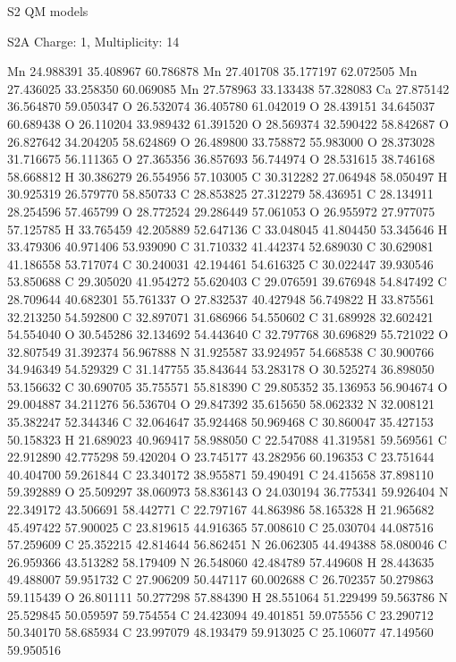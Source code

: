 \documentclass{article}
\begin{document}
S2 QM models  
   
S2A   Charge: 1, Multiplicity: 14    
   
Mn 24.988391 35.408967 60.786878
Mn 27.401708 35.177197 62.072505
Mn 27.436025 33.258350 60.069085
Mn 27.578963 33.133438 57.328083
Ca 27.875142 36.564870 59.050347
O 26.532074 36.405780 61.042019
O 28.439151 34.645037 60.689438
O 26.110204 33.989432 61.391520
O 28.569374 32.590422 58.842687
O 26.827642 34.204205 58.624869
O 26.489800 33.758872 55.983000
O 28.373028 31.716675 56.111365
O 27.365356 36.857693 56.744974
O 28.531615 38.746168 58.668812
H 30.386279 26.554956 57.103005
C 30.312282 27.064948 58.050497
H 30.925319 26.579770 58.850733
C 28.853825 27.312279 58.436951
C 28.134911 28.254596 57.465799
O 28.772524 29.286449 57.061053
O 26.955972 27.977075 57.125785
H 33.765459 42.205889 52.647136
C 33.048045 41.804450 53.345646
H 33.479306 40.971406 53.939090
C 31.710332 41.442374 52.689030
C 30.629081 41.186558 53.717074
C 30.240031 42.194461 54.616325
C 30.022447 39.930546 53.850688
C 29.305020 41.954272 55.620403
C 29.076591 39.676948 54.847492
C 28.709644 40.682301 55.761337
O 27.832537 40.427948 56.749822
H 33.875561 32.213250 54.592800
C 32.897071 31.686966 54.550602
C 31.689928 32.602421 54.554040
O 30.545286 32.134692 54.443640
C 32.797768 30.696829 55.721022
O 32.807549 31.392374 56.967888
N 31.925587 33.924957 54.668538
C 30.900766 34.946349 54.529329
C 31.147755 35.843644 53.283178
O 30.525274 36.898050 53.156632
C 30.690705 35.755571 55.818390
C 29.805352 35.136953 56.904674
O 29.004887 34.211276 56.536704
O 29.847392 35.615650 58.062332
N 32.008121 35.382247 52.344346
C 32.064647 35.924468 50.969468
C 30.860047 35.427153 50.158323
H 21.689023 40.969417 58.988050
C 22.547088 41.319581 59.569561
C 22.912890 42.775298 59.420204
O 23.745177 43.282956 60.196353
C 23.751644 40.404700 59.261844
C 23.340172 38.955871 59.490491
C 24.415658 37.898110 59.392889
O 25.509297 38.060973 58.836143
O 24.030194 36.775341 59.926404
N 22.349172 43.506691 58.442771
C 22.797167 44.863986 58.165328
H 21.965682 45.497422 57.900025
C 23.819615 44.916365 57.008610
C 25.030704 44.087516 57.259609
C 25.352215 42.814644 56.862451
N 26.062305 44.494388 58.080046
C 26.959366 43.513282 58.179409
N 26.548060 42.484789 57.449608
H 28.443635 49.488007 59.951732
C 27.906209 50.447117 60.002688
C 26.702357 50.279863 59.115439
O 26.801111 50.277298 57.884390
H 28.551064 51.229499 59.563786
N 25.529845 50.059597 59.754554
C 24.423094 49.401851 59.075556
C 23.290712 50.340170 58.685934
C 23.997079 48.193479 59.913025
C 25.106077 47.149560 59.950516
\end{document}
